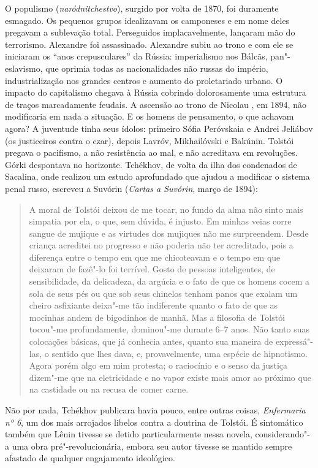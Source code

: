 O populismo (\emph{naródnitchestvo}), surgido por volta de 1870,
foi duramente esmagado. Os pequenos grupos idealizavam os camponeses
e em nome deles pregavam a sublevação total. Perseguidos
implacavelmente, lançaram mão do terrorismo. Alexandre 
foi assassinado. Alexandre  subiu ao trono e com ele
se iniciaram os ``anos crepusculares'' da Rússia: imperialismo nos
Bálcãs, pan"-eslavismo, que oprimia todas as nacionalidades não
russas do império, industrialização nos grandes centros e aumento
do proletariado urbano. O impacto do capitalismo chegava à Rússia
cobrindo dolorosamente uma estrutura de traços marcadamente feudais.
A ascensão ao trono de Nicolau , em 1894, não modificaria
em nada a situação. E os homens de pensamento, o que achavam agora?
A juventude tinha seus ídolos: primeiro Sófia Peróvskaia e Andrei
Jeliábov (os justiceiros contra o czar), depois Lavróv, Mikhailóvski
e Bakúnin. Tolstói pregava o pacifismo, a não resistência ao mal, e
não acreditava em revoluções. Górki despontava no horizonte. Tchékhov,
de volta da ilha dos condenados de Sacalina, onde realizou um
estudo aprofundado que ajudou a modificar o sistema penal russo,
escreveu a Suvórin (\emph{Cartas a Suvórin}, março de 1894): 

\begin{quotation}
A moral de Tolstói deixou de me tocar, no fundo da alma não sinto
mais simpatia por ela, o que, sem dúvida, é injusto. Em minhas
veias corre sangue de mujique e as virtudes dos mujiques não me
surpreendem. Desde criança acreditei no progresso e não poderia
não ter acreditado, pois a diferença entre o tempo em que me
chicoteavam e o tempo em que deixaram de fazê"-lo foi terrível.
Gosto de pessoas inteligentes, de sensibilidade, da delicadeza,
da argúcia e o fato de que os homens cocem a sola de seus pés ou
que sob seus chinelos tenham panos que exalam um cheiro asfixiante
deixa"-me tão indiferente quanto o fato de que as mocinhas andem
de bigodinhos de manhã. Mas a filosofia de Tolstói tocou"-me
profundamente, dominou"-me durante 6--7 anos. Não tanto suas
colocações básicas, que já conhecia antes, quanto sua maneira de
expressá"-las, o sentido que lhes dava, e, provavelmente, uma
espécie de hipnotismo. Agora porém algo em mim protesta; o
raciocínio e o senso da justiça dizem"-me que na eletricidade e
no vapor existe mais amor ao próximo que na castidade ou na recusa
de comer carne. 
\end{quotation}

Não por nada, Tchékhov publicara havia pouco, entre outras coisas,
\emph{Enfermaria nº 6}, um dos mais arrojados libelos contra a
doutrina de Tolstói. É sintomático também que Lênin tivesse se
detido particularmente nessa novela, considerando"-a uma obra
pré"-revolucionária, embora seu autor tivesse se mantido sempre
afastado de qualquer engajamento ideológico.

